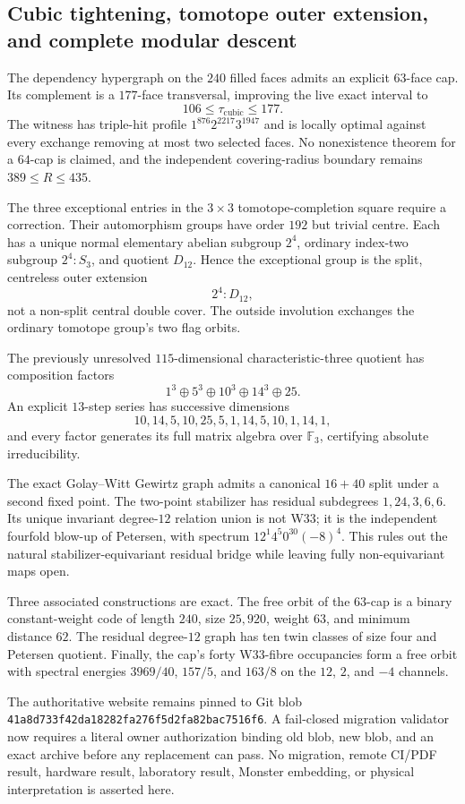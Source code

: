 \subsection{Cubic tightening, tomotope outer extension, and complete modular descent}
\label{sec:bt3847-3862}

The dependency hypergraph on the $240$ filled faces admits an explicit $63$-face cap. Its complement is a $177$-face transversal, improving the live exact interval to
\[
106\leq \tau_{\mathrm{cubic}}\leq177.
\]
The witness has triple-hit profile $1^{876}2^{2217}3^{1947}$ and is locally optimal against every exchange removing at most two selected faces. No nonexistence theorem for a $64$-cap is claimed, and the independent covering-radius boundary remains $389\leq R\leq435$.

The three exceptional entries in the $3\times3$ tomotope-completion square require a correction. Their automorphism groups have order $192$ but trivial centre. Each has a unique normal elementary abelian subgroup $2^4$, ordinary index-two subgroup $2^4\!:\!S_3$, and quotient $D_{12}$. Hence the exceptional group is the split, centreless outer extension
\[
2^4\!:\!D_{12},
\]
not a non-split central double cover. The outside involution exchanges the ordinary tomotope group's two flag orbits.

The previously unresolved $115$-dimensional characteristic-three quotient has composition factors
\[
1^3\oplus5^3\oplus10^3\oplus14^3\oplus25.
\]
An explicit $13$-step series has successive dimensions
\[
10,14,5,10,25,5,1,14,5,10,1,14,1,
\]
and every factor generates its full matrix algebra over $\mathbb F_3$, certifying absolute irreducibility.

The exact Golay--Witt Gewirtz graph admits a canonical $16+40$ split under a second fixed point. The two-point stabilizer has residual subdegrees $1,24,3,6,6$. Its unique invariant degree-$12$ relation union is not W33; it is the independent fourfold blow-up of Petersen, with spectrum $12^1 4^5 0^{30}(-8)^4$. This rules out the natural stabilizer-equivariant residual bridge while leaving fully non-equivariant maps open.

Three associated constructions are exact. The free orbit of the $63$-cap is a binary constant-weight code of length $240$, size $25{,}920$, weight $63$, and minimum distance $62$. The residual degree-$12$ graph has ten twin classes of size four and Petersen quotient. Finally, the cap's forty W33-fibre occupancies form a free orbit with spectral energies $3969/40$, $157/5$, and $163/8$ on the $12$, $2$, and $-4$ channels.

The authoritative website remains pinned to Git blob
\texttt{41a8d733f42da18282fa276f5d2fa82bac7516f6}. A fail-closed migration validator now requires a literal owner authorization binding old blob, new blob, and an exact archive before any replacement can pass. No migration, remote CI/PDF result, hardware result, laboratory result, Monster embedding, or physical interpretation is asserted here.
